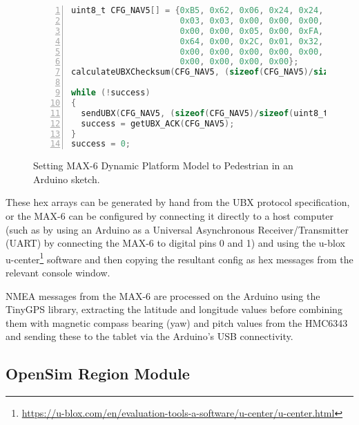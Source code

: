 \begin{figure}[h]
\begin{lstlisting}[language=C, numbers=left, numberstyle=\small, stepnumber=1, frame=single, breaklines=true, backgroundcolor=\color{codebackground}, showstringspaces=false]
uint8_t CFG_NAV5[] = {0xB5, 0x62, 0x06, 0x24, 0x24, 0x00, 0xFF, 0xFF,
                      0x03, 0x03, 0x00, 0x00, 0x00, 0x00, 0x10, 0x27,
                      0x00, 0x00, 0x05, 0x00, 0xFA, 0x00, 0xFA, 0x00,
                      0x64, 0x00, 0x2C, 0x01, 0x32, 0x3C, 0x00, 0x00,
                      0x00, 0x00, 0x00, 0x00, 0x00, 0x00, 0x00, 0x00,
                      0x00, 0x00, 0x00, 0x00};
calculateUBXChecksum(CFG_NAV5, (sizeof(CFG_NAV5)/sizeof(uint8_t)));

while (!success)
{
  sendUBX(CFG_NAV5, (sizeof(CFG_NAV5)/sizeof(uint8_t)));
  success = getUBX_ACK(CFG_NAV5);
}
success = 0;
\end{lstlisting}
\caption{Setting MAX-6 Dynamic Platform Model to Pedestrian in an Arduino sketch.}
\label{arduinoMAX6hex}
\end{figure}

These hex arrays can be generated by hand from the UBX protocol specification\maxProtocolFootnote{}, or the MAX-6 can be configured by connecting it directly to a host computer (such as by using an Arduino as a Universal Asynchronous Receiver/Transmitter (UART) by connecting the MAX-6 to digital pins 0 and 1) and using the u-blox u-center\footnote{\url{https://u-blox.com/en/evaluation-tools-a-software/u-center/u-center.html}} software and then copying the resultant config as hex messages from the relevant console window.

NMEA messages from the MAX-6 are processed on the Arduino using the TinyGPS library\tinygpsFootnote{}, extracting the latitude and longitude values before combining them with magnetic compass bearing (yaw) and pitch values from the HMC6343 and sending these to the tablet via the Arduino's USB connectivity.


\subsection{OpenSim Region Module}

\label{regionModule}

\newcommand{\RegionModuleFootnote}{\footnote{\url{http://opensimulator.org/wiki/IRegionModule}}}

